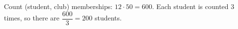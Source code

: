 Count (student, club) memberships: $12\cdot50=600$. Each student is counted $3$ times, so there are $\dfrac{600}{3}=\boxed{200}$ students.
